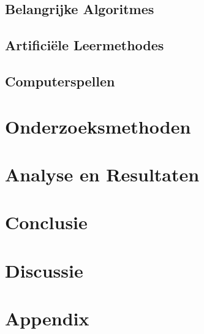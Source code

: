 \documentclass[a4paper,12pt]{report}
\begin{document}
\section{Belangrijke Algoritmes}

\section{Artificiële Leermethodes}

\section{Computerspellen}

\chapter{Onderzoeksmethoden}

\chapter{Analyse en Resultaten}

\chapter{Conclusie}

\chapter{Discussie}

\chapter*{Appendix}

\printbibliography
{}
\end{document}
